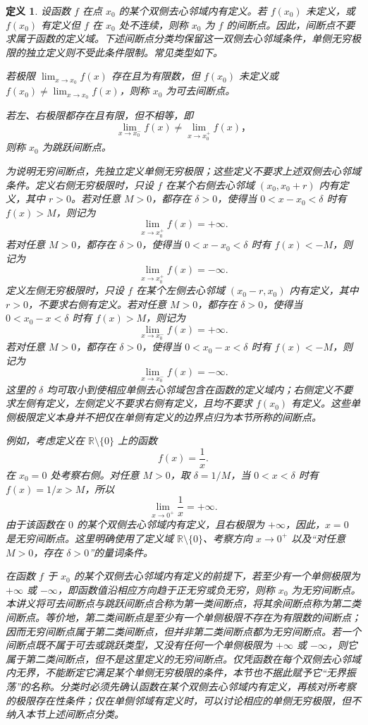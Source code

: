 \documentclass[UTF8,fontset=fandol,11pt]{ctexart}
\newtheorem{definition}{定义}[section]
\begin{document}
\begin{definition}
设函数 $f$ 在点 $x_0$ 的某个双侧去心邻域内有定义。若 $f(x_0)$ 未定义，或 $f(x_0)$ 有定义但 $f$ 在 $x_0$ 处不连续，则称 $x_0$ 为 $f$ 的间断点。因此，间断点不要求属于函数的定义域。下述间断点分类均保留这一双侧去心邻域条件，单侧无穷极限的独立定义则不受此条件限制。常见类型如下。

若极限 $\lim_{x\to x_0}f(x)$ 存在且为有限数，但 $f(x_0)$ 未定义或 $f(x_0)\neq\lim_{x\to x_0}f(x)$，则称 $x_0$ 为可去间断点。

若左、右极限都存在且有限，但不相等，即
\[
\lim_{x\to x_0^-}f(x)\neq\lim_{x\to x_0^+}f(x)\text{，}
\]
则称 $x_0$ 为跳跃间断点。

为说明无穷间断点，先独立定义单侧无穷极限；这些定义不要求上述双侧去心邻域条件。定义右侧无穷极限时，只设 $f$ 在某个右侧去心邻域 $(x_0,x_0+r)$ 内有定义，其中 $r>0$。若对任意 $M>0$，都存在 $\delta>0$，使得当 $0<x-x_0<\delta$ 时有 $f(x)>M$，则记为
\[
\lim_{x\to x_0^+}f(x)=+\infty.
\]
若对任意 $M>0$，都存在 $\delta>0$，使得当 $0<x-x_0<\delta$ 时有 $f(x)<-M$，则记为
\[
\lim_{x\to x_0^+}f(x)=-\infty.
\]
定义左侧无穷极限时，只设 $f$ 在某个左侧去心邻域 $(x_0-r,x_0)$ 内有定义，其中 $r>0$，不要求右侧有定义。若对任意 $M>0$，都存在 $\delta>0$，使得当 $0<x_0-x<\delta$ 时有 $f(x)>M$，则记为
\[
\lim_{x\to x_0^-}f(x)=+\infty.
\]
若对任意 $M>0$，都存在 $\delta>0$，使得当 $0<x_0-x<\delta$ 时有 $f(x)<-M$，则记为
\[
\lim_{x\to x_0^-}f(x)=-\infty.
\]
这里的 $\delta$ 均可取小到使相应单侧去心邻域包含在函数的定义域内；右侧定义不要求左侧有定义，左侧定义不要求右侧有定义，且均不要求 $f(x_0)$ 有定义。这些单侧极限定义本身并不把仅在单侧有定义的边界点归为本节所称的间断点。

例如，考虑定义在 $\mathbb{R}\setminus\{0\}$ 上的函数
\[
f(x)=\frac{1}{x}.
\]
在 $x_0=0$ 处考察右侧。对任意 $M>0$，取 $\delta=1/M$，当 $0<x<\delta$ 时有 $f(x)=1/x>M$，所以
\[
\lim_{x\to0^+}\frac{1}{x}=+\infty.
\]
由于该函数在 $0$ 的某个双侧去心邻域内有定义，且右极限为 $+\infty$，因此，$x=0$ 是无穷间断点。这里明确使用了定义域 $\mathbb{R}\setminus\{0\}$、考察方向 $x\to0^+$ 以及“对任意 $M>0$，存在 $\delta>0$”的量词条件。

在函数 $f$ 于 $x_0$ 的某个双侧去心邻域内有定义的前提下，若至少有一个单侧极限为 $+\infty$ 或 $-\infty$，即函数值沿相应方向趋于正无穷或负无穷，则称 $x_0$ 为无穷间断点。本讲义将可去间断点与跳跃间断点合称为第一类间断点，将其余间断点称为第二类间断点。等价地，第二类间断点是至少有一个单侧极限不存在为有限数的间断点；因而无穷间断点属于第二类间断点，但并非第二类间断点都为无穷间断点。若一个间断点既不属于可去或跳跃类型，又没有任何一个单侧极限为 $+\infty$ 或 $-\infty$，则它属于第二类间断点，但不是这里定义的无穷间断点。仅凭函数在每个双侧去心邻域内无界，不能断定它满足某个单侧无穷极限的条件，本节也不据此赋予它“无界振荡”的名称。分类时必须先确认函数在某个双侧去心邻域内有定义，再核对所考察的极限存在性条件；仅在单侧邻域有定义时，可以讨论相应的单侧无穷极限，但不纳入本节上述间断点分类。\label{def:discontinuity-types}
\end{definition}
\end{document}
